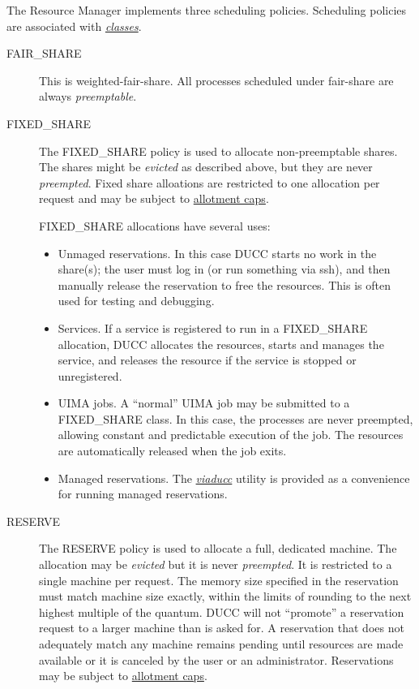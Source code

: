     The Resource Manager implements three scheduling policies. Scheduling policies are
    associated with \hyperref[sec:rm.job-classes]{\em classes}.
    \begin{description}
        \item[FAIR\_SHARE] This is weighted-fair-share.  All processes scheduled under
           fair-share are always {\em preemptable}.

        \item[FIXED\_SHARE] The FIXED\_SHARE policy is used to allocate non-preemptable
          shares.  The shares might be {\em evicted} as described above, but they are 
          never {\em preempted}.  Fixed share alloations are restricted to one
          allocation per request and may be subject to \hyperref[sec:rm.allotment]{allotment caps}.

          FIXED\_SHARE allocations have several uses:
          \begin{itemize}
            \item Unmaged reservations.  In this case DUCC starts no work in the share(s); the user must
              log in (or run something via ssh), and then manually release the reservation to free
              the resources.  This is often used for testing and debugging.
            \item Services.  If a service is registered to run in a FIXED\_SHARE allocation,
              DUCC allocates the resources, starts and manages the service, and releases the
              resource if the service is stopped or unregistered.
            \item UIMA jobs.  A ``normal'' UIMA job may be submitted to a FIXED\_SHARE
              class.  In this case, the processes are never preempted, allowing constant and
              predictable execution of the job.  The resources are automatically released when
              the job exits.
            \item Managed reservations.  The \hyperref[sec:cli.viaducc]{\em viaducc} utility is provided 
              as a convenience for running managed reservations.
          \end{itemize}                    
          
        \item[RESERVE] The RESERVE policy is used to allocate a full, dedicated machine.
          The allocation may be {\em evicted} but it is never {\em preempted}. It is
          restricted to a single machine per request.  The memory size
          specified in the reservation must match machine size
          exactly, within the limits of rounding to the next highest multiple of the
          quantum.  DUCC will not ``promote'' a reservation request to a larger machine
          than is asked for.  A reservation that does not adequately match any
          machine remains pending until resources are made available or it is 
          canceled by the user or an administrator. Reservations may be
          subject to \hyperref[sec:rm.allotment]{allotment caps}.

    \end{description}
    
